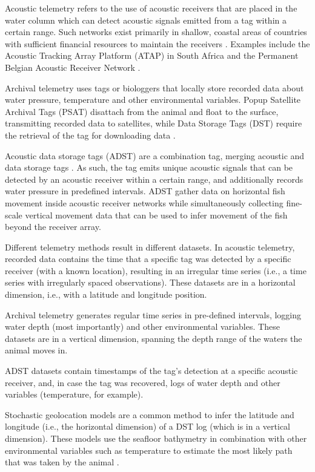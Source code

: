 \documentclass[
  authoryear,
  review,
  3p]{elsarticle}
\begin{document}
Acoustic telemetry refers to the use of acoustic receivers that are
placed in the water column which can detect acoustic signals emitted
from a tag within a certain range. Such networks exist primarily in
shallow, coastal areas of countries with sufficient financial resources
to maintain the receivers \citep{hussey_2015}. Examples include the
Acoustic Tracking Array Platform (ATAP) in South Africa
\citep{cowley_2017} and the Permanent Belgian Acoustic Receiver Network
\citep[PBARN,][]{reubens_2019}.

Archival telemetry uses tags or biologgers that locally store recorded
data about water pressure, temperature and other environmental
variables. Popup Satellite Archival Tags (PSAT) disattach from the
animal and float to the surface, transmitting recorded data to
satellites, while Data Storage Tags (DST) require the retrieval of the
tag for downloading data \citep{thorstad_2013}.

Acoustic data storage tags (ADST) are a combination tag, merging
acoustic and data storage tags \citep{goossens_2023}. As such, the tag
emits unique acoustic signals that can be detected by an acoustic
receiver within a certain range, and additionally records water pressure
in predefined intervals. ADST gather data on horizontal fish movement
inside acoustic receiver networks while simultaneously collecting
fine-scale vertical movement data that can be used to infer movement of
the fish beyond the receiver array.

Different telemetry methods result in different datasets. In acoustic
telemetry, recorded data contains the time that a specific tag was
detected by a specific receiver (with a known location), resulting in an
irregular time series (i.e., a time series with irregularly spaced
observations). These datasets are in a horizontal dimension, i.e., with
a latitude and longitude position.

Archival telemetry generates regular time series in pre-defined
intervals, logging water depth (most importantly) and other
environmental variables. These datasets are in a vertical dimension,
spanning the depth range of the waters the animal moves in.

ADST datasets contain timestamps of the tag's detection at a specific
acoustic receiver, and, in case the tag was recovered, logs of water
depth and other variables (temperature, for example).

Stochastic geolocation models are a common method to infer the latitude
and longitude (i.e., the horizontal dimension) of a DST log (which is in
a vertical dimension). These models use the seafloor bathymetry in
combination with other environmental variables such as temperature to
estimate the most likely path that was taken by the animal
\citep{nielsen_2004, gatti_2021}.
\end{document}

